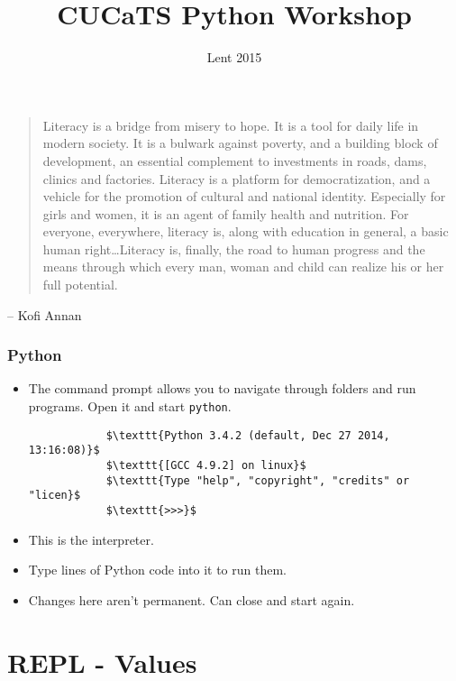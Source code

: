 \documentclass[notes]{beamer}
\title{CUCaTS Python Workshop}
\date{Lent 2015}
\begin{document}
	
	\begin{frame}[fragile]
		\maketitle
	\end{frame}
	
	\begin{frame}[fragile]
		\begin{quotation}
			Literacy is a bridge from misery to hope. It is a tool for daily life in modern society. It is a bulwark against poverty, and a building block of development, an essential complement to investments in roads, dams, clinics and factories. Literacy is a platform for democratization, and a vehicle for the promotion of cultural and national identity. Especially for girls and women, it is an agent of family health and nutrition. For everyone, everywhere, literacy is, along with education in general, a basic human right\dots Literacy is, finally, the road to human progress and the means through which every man, woman and child can realize his or her full potential.
		\end{quotation}
		\hfill  -- Kofi Annan
	\end{frame}
	
	\begin{frame}[fragile]
		\frametitle{Python}
		\begin{itemize}
			\item The \colorbox{jargonbg}{command prompt} allows you to navigate through folders and run programs. Open it and start \lstinline|python|.
			\begin{lstlisting}
			$\texttt{Python 3.4.2 (default, Dec 27 2014, 13:16:08)}$
			$\texttt{[GCC 4.9.2] on linux}$
			$\texttt{Type "help", "copyright", "credits" or "licen}$
			$\texttt{>>>}$
			\end{lstlisting}
			\item This is the \colorbox{jargonbg}{interpreter}.
			\item Type lines of Python code into it to run them.
			\item Changes here aren't permanent. Can close and start again.
		\end{itemize}
	\end{frame}
	
	\section{REPL - Values}
	
\end{document}
